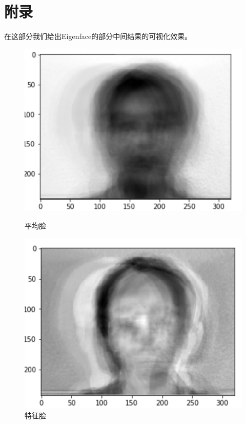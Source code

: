 \documentclass{ctexart}
\begin{document}
    \section{附录}
    在这部分我们给出Eigenface的部分中间结果的可视化效果。
    \begin{figure}[htbp]
        \begin{minipage}[t]{0.45 \linewidth}
            \centering
            \includegraphics[scale=0.23]{imgs/avg_face.png}
            \caption{平均脸}
            \label{avg}
        \end{minipage}
        \begin{minipage}[t]{0.45 \linewidth}
            \centering
            \includegraphics[scale=0.45]{imgs/eigenface.png}
            \caption{特征脸}
            \label{eigenface}
        \end{minipage}
    \end{figure}
\end{document}
